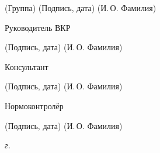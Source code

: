 \documentclass[14pt, russian]{scrartcl}
\begin{document}
\begin{titlepage}
\vspace{-2.1ex}
\noindent\hspace{9ex}\scriptsize{(Группа)}\normalsize\hspace{170pt}
\hspace{2ex}\scriptsize{(Подпись, дата)}\normalsize\hspace{30pt}
\hspace{6ex}\scriptsize{(И.\,О. Фамилия)}\normalsize

\bigskip

\noindent Руководитель ВКР \hfill
\underline{\hspace{4cm}}\quad\underline{\hspace{4cm}}

\vspace{-2ex}
\noindent\hspace{13.5ex}\normalsize\hspace{170pt}
\hspace{2ex}\scriptsize{(Подпись, дата)}\normalsize\hspace{30pt}
\hspace{6ex}\scriptsize{(И.\,О. Фамилия)}\normalsize

\bigskip

\noindent Консультант \hfill
\underline{\hspace{4cm}}\quad\underline{\hspace{4cm}}

\vspace{-2ex}
\noindent\hspace{13.5ex}\normalsize\hspace{170pt}
\hspace{2ex}\scriptsize{(Подпись, дата)}\normalsize\hspace{30pt}
\hspace{6ex}\scriptsize{(И.\,О. Фамилия)}\normalsize

\bigskip

\noindent Нормоконтролёр \hfill
\underline{\hspace{4cm}}\quad\underline{\hspace{4cm}}

\vspace{-2ex}
\noindent\hspace{13.5ex}\normalsize\hspace{170pt}
\hspace{2ex}\scriptsize{(Подпись, дата)}\normalsize\hspace{30pt}
\hspace{6ex}\scriptsize{(И.\,О. Фамилия)}\normalsize

\vfill

\begin{center}
  \textsl{\the\year{} г.}
\end{center}
\end{titlepage}
\end{document}
